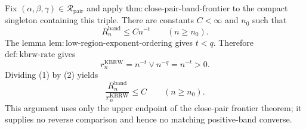 Fix \((\alpha,\beta,\gamma)\in\mathcal R_{\mathrm{pair}}\) and apply
\(\mathrm{thm:close\mbox{-}pair\mbox{-}band\mbox{-}frontier}\) to the compact
singleton containing this triple.  There are constants \(C<\infty\) and \(n_0\)
such that
\[
R_n^{\mathrm{band}}\leq Cn^{-t}
\qquad(n\geq n_0).
\tag{1}
\]
The lemma \(\mathrm{lem:low\mbox{-}region\mbox{-}exponent\mbox{-}ordering}\)
gives \(t<q\).  Therefore \(\mathrm{def:kbrw\mbox{-}rate}\) gives
\[
r_n^{\mathrm{KBRW}}=n^{-t}\vee n^{-q}=n^{-t}>0.
\tag{2}
\]
Dividing (1) by (2) yields
\[
\frac{R_n^{\mathrm{band}}}{r_n^{\mathrm{KBRW}}}\leq C
\qquad(n\geq n_0).
\]
This argument uses only the upper endpoint of the close-pair frontier theorem;
it supplies no reverse comparison and hence no matching positive-band converse.